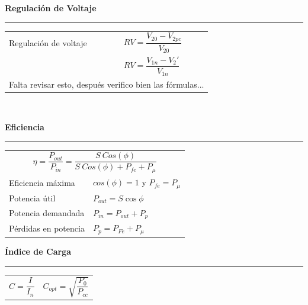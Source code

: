 \documentclass[11pt,a4paper]{article}
\newcommand{\subtitulo}[1]{
	\textbf{#1} \\ \vspace{.1cm} {\color{gray} \hrule}
}
\begin{document}
	\newpage
\begin{cajita}
	\centering
	\begin{multicols}{2}
	
	\subtitulo{Regulación de Voltaje}
	\vspace{.3cm}
	
		\begin{tabular}{l l}
			Regulación de voltaje & $RV=\dfrac{V_{20}-V_{2pc}}{V_{20}}$ \vspace{.2cm} \\
			& $RV = \dfrac{V_{1n} - V_2'}{V_{1n}}$ \vspace{.2cm}\\
			\multicolumn{2}{l}{Falta revisar esto, después verifico bien las fórmulas... \vspace{.2cm}} \\
		\end{tabular}\\
	
	\vspace{2cm}
	
	
	\subtitulo{Eficiencia \vspace{.1cm}} 
	\vspace{.3cm}
	
		\begin{tabular}{l l}
			\multicolumn{2}{c}{$\eta = \dfrac{P_{out}}{P_{in}}= \dfrac{S~Cos(\phi)}{S~Cos(\phi )+P_{fe}+P_{\mu}}$\vspace{.2cm}}\\
			
			Eficiencia máxima & $cos(\phi)=1$ y $ P_{fe}=P_{\mu }$ \\
			Potencia útil & $P_{out} = S \cos \phi$\\
			Potencia demandada & $P_{in} = P_{out} + P_{p}$\\
			Pérdidas en potencia & $P_p = P_{Fe} + P_\mu$\\
		\end{tabular}
	
	\vspace{.3cm}
	
	\subtitulo{Índice de Carga}
	\vspace{.3cm}
	
		\begin{tabular}{l l}
			$C = \dfrac{I}{I_n}$ & $C_{opt} = \sqrt{\dfrac{P_0}{P_{cc}}}$\\
		\end{tabular}
			
	\end{multicols}
	
	
\end{cajita}	
	
	
\end{document}
